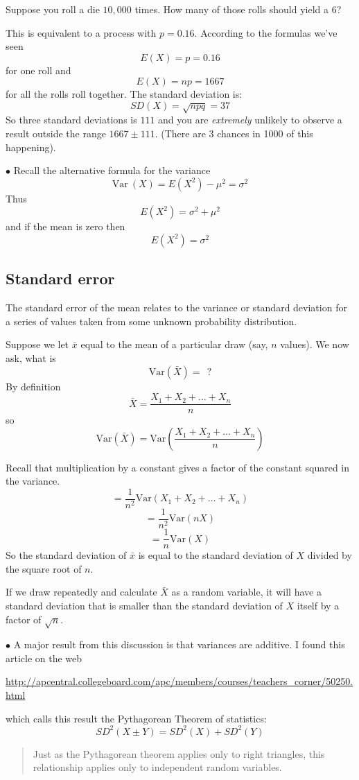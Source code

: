 \documentclass[11pt, oneside]{article}
\begin{document}
Suppose you roll a die $10,000$ times.  How many of those rolls should yield a $6$?

This is equivalent to a process with $p = 0.16$.  According to the formulas we've seen
\[ E(X) = p = 0.16 \]
 for one roll and
\[ E(X) = np = 1667 \]
for all the rolls roll together.  The standard deviation is:
\[ SD(X) = \sqrt{npq} = 37\]
So three standard deviations is $111$ and you are \emph{extremely} unlikely to observe a result outside the range $1667 \pm 111$.  (There are 3 chances in 1000 of this happening).

$\bullet$ Recall the alternative formula for the variance
\[ \text{Var} \ (X) = E(X^2) - \mu^2 = \sigma^2 \]
Thus
\[ E(X^2) = \sigma^2 + \mu^2 \]
and if the mean is zero then
\[ E(X^2) = \sigma^2  \]

 \subsection*{Standard error}
 The standard error of the mean relates to the variance or standard deviation for a series of values taken from some unknown probability distribution.
 
 Suppose we let $\bar{x}$ equal to the mean of a particular draw (say, $n$ values).  We now ask, what is
\[ \text{Var}(\bar{X}) = \ \ ? \]
By definition
\[ \bar{X} = \frac{X_1 + X_2 + \dots + X_n}{n} \]
so
\[ \text{Var}(\bar{X}) = \text{Var}( \frac{X_1 + X_2 + \dots + X_n}{n}) \]

Recall that multiplication by a constant gives a factor of the constant squared in the variance.
\[ = \frac{1}{n^2} \text{Var}(X_1 + X_2 + \dots + X_n) \]
\[ = \frac{1}{n^2} \text{Var}(n X) \]
\[ = \frac{1}{n} \text{Var}(X) \]
So the standard deviation of $\bar{x}$ is equal to the standard deviation of $X$ divided by the square root of $n$.

If we draw repeatedly and calculate $\bar{X}$ as a random variable, it will have a standard deviation that is smaller than the standard deviation of $X$ itself by a factor of $\sqrt{n}$.

$\bullet$ A major result from this discussion is that variances are additive.  I found this article on the web

\url{http://apcentral.collegeboard.com/apc/members/courses/teachers_corner/50250.html}

which calls this result the Pythagorean Theorem of statistics:
\[ SD^2(X \pm Y) = SD^2(X) + SD^2(Y) \]

\begin{quote}\color{blue}Just as the Pythagorean theorem applies only to right triangles, this relationship applies only to independent random variables.\color{black}\end{quote}
\end{document}
